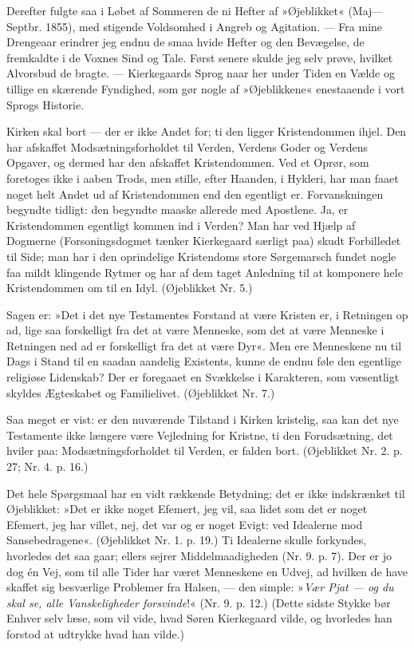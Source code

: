 \documentclass[12pt,a4paper,openany]{book}
\newcommand{\opage}[1]{\marginnote{\footnotesize\textit{[#1]}}}
\begin{document}
Derefter fulgte saa i Løbet af Sommeren de ni
Hefter af »Øjeblikket« (Maj---Septbr. 1855), med stigende
Voldsomhed i Angreb og Agitation. --- Fra mine Drengeaar
erindrer jeg endnu de smaa hvide Hefter og den
Bevægelse, de fremkaldte i de Voxnes Sind og Tale.
Først senere skulde jeg selv prøve, hvilket Alvorsbud de
bragte. --- Kierkegaards Sprog naar her under Tiden en
Vælde og tillige en skærende Fyndighed, som gør nogle
af »Øjeblikkene« enestaaende i vort Sprogs Historie.

Kirken skal bort --- der er ikke Andet for; ti den
ligger Kristendommen ihjel. Den har afskaffet Modsætningsforholdet
til Verden, Verdens Goder og Verdens
Opgaver, og dermed har den afskaffet Kristendommen.
Ved et Oprør, som foretoges ikke i aaben Trods, men
stille, efter Haanden, i Hykleri, har man faaet noget helt
Andet ud af Kristendommen end den egentligt er. Forvanskningen
begyndte tidligt: den begyndte maaske allerede
med Apostlene. Ja, er Kristendommen egentligt
kommen ind i Verden? Man har ved Hjælp af Dogmerne
(Forsoningsdogmet tænker Kierkegaard særligt paa) skudt
Forbilledet til Side; man har i den oprindelige Kristendoms
store Sørgemarsch fundet nogle faa mildt klingende
Rytmer og har af dem taget Anledning til at komponere
hele Kristendommen om til en Idyl. (Øjeblikket Nr. 5.)

Sagen er: »Det i det nye Testamentes Forstand at
være Kristen er, i Retningen op ad, lige saa forskelligt
fra det at være Menneske, som det at være Menneske i
Retningen ned ad er forskelligt fra det at være Dyr«.
\opage{148}Men ere Menneskene nu til Dags i Stand til en saadan
aandelig Existents, kunne de endnu føle den egentlige
religiøse Lidenskab? Der er foregaaet en Svækkelse i
Karakteren, som væsentligt skyldes Ægteskabet og
Familielivet. (Øjeblikket Nr. 7.)

Saa meget er vist: er den nuværende Tilstand i
Kirken kristelig, saa kan det nye Testamente ikke længere
være Vejledning for Kristne, ti den Forudsætning,
det hviler paa: Modsætningsforholdet til Verden, er falden
bort. (Øjeblikket Nr. 2. p. 27; Nr. 4. p. 16.)

Det hele Spørgsmaal har en vidt rækkende Betydning;
det er ikke indskrænket til Øjeblikket: »Det er
ikke noget Efemert, jeg vil, saa lidet som det er noget
Efemert, jeg har villet, nej, det var og er noget Evigt:
ved Idealerne mod Sansebedragene«. (Øjeblikket Nr. 1.
p. 19.) Ti Idealerne skulle forkyndes, hvorledes det saa
gaar; ellers sejrer Middelmaadigheden (Nr. 9. p. 7). Der
er jo dog én Vej, som til alle Tider har været Menneskene
en Udvej, ad hvilken de have skaffet sig besværlige
Problemer fra Halsen, --- den simple: »\textit{Vær Pjat
--- og du skal se, alle Vanskeligheder forsvinde}!« (Nr. 9.
p. 12.) (Dette sidste Stykke bør Enhver selv læse, som
vil vide, hvad Søren Kierkegaard vilde, og hvorledes
han forstod at udtrykke hvad han vilde.)
\end{document}
